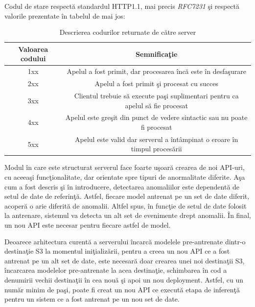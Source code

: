 \documentclass[a4paper,12pt]{report}
\begin{document}
\par Codul de stare respectă standardul HTTP1.1, mai precis \emph{RFC7231}\cite{RFC7231} şi respectă valorile prezentate în tabelul de mai jos: 
\begin{table}[h]
\begin{tabular}{|c|c|}
\hline
Valoarea codului & Semnificaţie                                                                   \\
\hline
1xx   & Apelul a fost primit, dar procesarea încă este în desfaşurare                  \\
\hline
2xx   & Apelul a fost primit şi procesat cu succes                                     \\
\hline
3xx   & Clientul trebuie să execute paşi suplimentari pentru ca apelul să fie procesat \\
\hline
4xx   & Apelul este greşit din punct de vedere sintactic sau nu poate fi procesat      \\
\hline
5xx   & Apelul este valid dar serverul a întâmpinat o eroare în timpul procesării   \\
\hline   
\end{tabular}
\caption{Descrierea codurilor returnate de către server}
\end{table}
\par Modul în care este structurat serverul face foarte uşoară crearea de noi API-uri, cu aceeaşi funcţionalitate, dar orientate spre tipuri de anormalitate diferite. Aşa cum a fost descris şi în introducere, detectarea anomaliilor este dependentă de setul de date de referinţă. Astfel, fiecare model antrenat pe un set de date diferit, acoperă o arie diferită de anomalii. Altfel spus, în funcţie de setul de date folosit la antrenare, sistemul va detecta un alt set de evenimente drept anomalii. În final, un nou API este necesar pentru fiecare astfel de model. 
\par Deoarece arhitectura curentă a serverului încarcă modelele pre-antrenate dintr-o destinaţie S3 la momentul iniţializării, pentru a creea un nou API ce a fost antrenat pe un alt set de date, este necesară doar crearea unei noi destinaţii S3, încarcarea modelelor pre-antrenate la acea destinaţie, schimbarea în cod a denumirii vechii destinaţii în cea nouă şi apoi un nou deployment. Astfel, cu un număr minim de paşi, poate fi creat un nou API ce execută etapa de inferenţă pentru un sistem ce a fost antrenat pe un nou set de date. 
\end{document}
